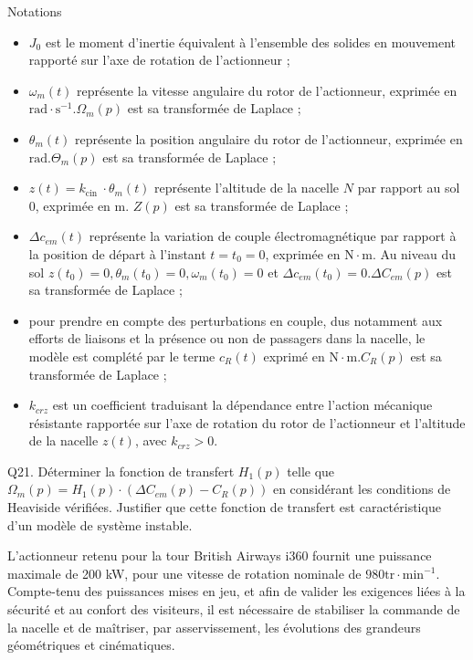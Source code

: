 \documentclass[10pt]{article}
\begin{document}
Notations

\begin{itemize}
  \item[-] $J_{0}$ est le moment d'inertie équivalent à l'ensemble des solides en mouvement rapporté sur l'axe de rotation de l'actionneur ;
  \item[-] $\omega_{m}(t)$ représente la vitesse angulaire du rotor de l'actionneur, exprimée en $\mathrm{rad} \cdot \mathrm{s}^{-1} . \Omega_{m}(p)$ est sa transformée de Laplace ;
  \item[-] $\theta_{m}(t)$ représente la position angulaire du rotor de l'actionneur, exprimée en $\mathrm{rad} . \Theta_{m}(p)$ est sa transformée de Laplace ;
  \item[-] $z(t)=k_{\text {cin }} \cdot \theta_{m}(t)$ représente l'altitude de la nacelle $N$ par rapport au sol 0, exprimée en m. $Z(p)$ est sa transformée de Laplace ;
  \item[-] $\Delta c_{e m}(t)$ représente la variation de couple électromagnétique par rapport à la position de départ à l'instant $t=t_{0}=0$, exprimée en $\mathrm{N} \cdot \mathrm{m}$. Au niveau du sol $z\left(t_{0}\right)=0, \theta_{m}\left(t_{0}\right)=0, \omega_{m}\left(t_{0}\right)=0$ et $\Delta c_{e m}\left(t_{0}\right)=0 . \Delta C_{e m}(p)$ est sa transformée de Laplace ;
  \item[-] pour prendre en compte des perturbations en couple, dus notamment aux efforts de liaisons et la présence ou non de passagers dans la nacelle, le modèle est complété par le terme $c_{R}(t)$ exprimé en $\mathrm{N} \cdot \mathrm{m} . C_{R}(p)$ est sa transformée de Laplace ;
  \item[-] $k_{c r z}$ est un coefficient traduisant la dépendance entre l'action mécanique résistante rapportée sur l'axe de rotation du rotor de l'actionneur et l'altitude de la nacelle $z(t)$, avec $k_{c r z}>0$.
\end{itemize}

Q21. Déterminer la fonction de transfert $H_{1}(p)$ telle que $\Omega_{m}(p)=H_{1}(p) \cdot\left(\Delta C_{e m}(p)-C_{R}(p)\right)$ en considérant les conditions de Heaviside vérifiées. Justifier que cette fonction de transfert est caractéristique d'un modèle de système instable.

L'actionneur retenu pour la tour British Airways i360 fournit une puissance maximale de 200 kW, pour une vitesse de rotation nominale de $980 \mathrm{tr} \cdot \mathrm{min}^{-1}$. Compte-tenu des puissances mises en jeu, et afin de valider les exigences liées à la sécurité et au confort des visiteurs, il est nécessaire de stabiliser la commande de la nacelle et de maîtriser, par asservissement, les évolutions des grandeurs géométriques et cinématiques.
\end{document}
